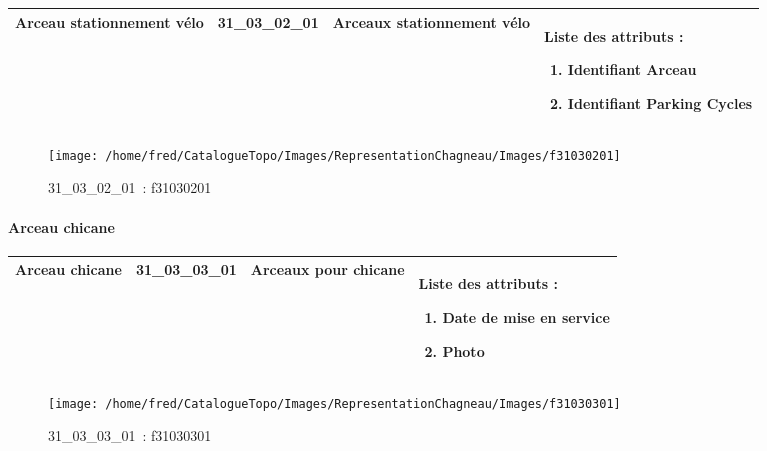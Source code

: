 \documentclass[12pt,titlepage]{book}
\begin{document}
\renewcommand{\arraystretch}{1.2}
\begin{supertabular}{|p{10cm}|c|p{13cm}|p{12cm}|}
 Arceau stationnement vélo & 31\_03\_02\_01 & Arceaux stationnement vélo & Liste des attributs :
\begin{enumerate}
  \item Identifiant Arceau  \item Identifiant Parking Cycles\end{enumerate}
\\
\hline
\end{supertabular}
\begin{figure}[h!]
  \hfill         %
  \begin{minipage}[t]{3cm}
    \begin{center}
      \texttt{[image: /home/fred/CatalogueTopo/Images/RepresentationChagneau/Images/f31030201]}
      \caption[~31\_03\_02\_01]{\small{31\_03\_02\_01~:} \tiny{f31030201}}\label{f31030201}
    \end{center}
  \end{minipage}
\end{figure}


\paragraph{Arceau chicane}
\noindent
\vspace{\baselineskip}

\renewcommand{\arraystretch}{1.2}
\begin{supertabular}{|p{10cm}|c|p{13cm}|p{12cm}|}
 Arceau chicane & 31\_03\_03\_01 & Arceaux pour chicane & Liste des attributs :
\begin{enumerate}
  \item Date de mise en service  \item Photo\end{enumerate}
\\
\hline
\end{supertabular}
\begin{figure}[h!]
  \hfill         %
  \begin{minipage}[t]{3cm}
    \begin{center}
      \texttt{[image: /home/fred/CatalogueTopo/Images/RepresentationChagneau/Images/f31030301]}
      \caption[~31\_03\_03\_01]{\small{31\_03\_03\_01~:} \tiny{f31030301}}\label{f31030301}
    \end{center}
  \end{minipage}
\end{figure}
\end{document}
